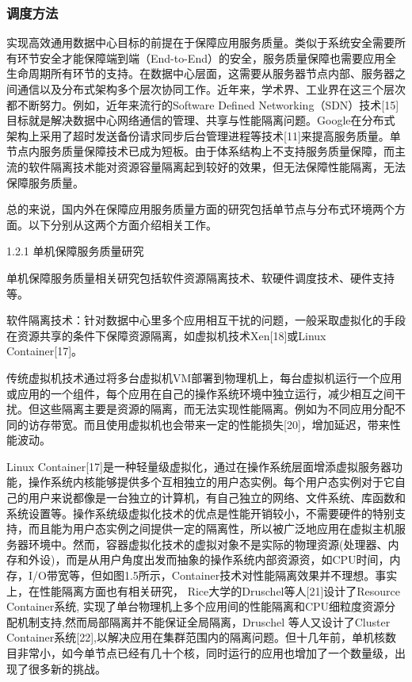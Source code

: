 \subsubsection*{调度方法}
\label{sec:other}

实现高效通用数据中心目标的前提在于保障应用服务质量。类似于系统安全需要所有环节安全才能保障端到端（End-to-End）的安全，服务质量保障也需要应用全生命周期所有环节的支持。在数据中心层面，这需要从服务器节点内部、服务器之间通信以及分布式架构多个层次协同工作。近年来，学术界、工业界在这三个层次都不断努力。例如，近年来流行的Software Defined Networking（SDN）技术[15]目标就是解决数据中心网络通信的管理、共享与性能隔离问题。Google在分布式架构上采用了超时发送备份请求同步后台管理进程等技术[11]来提高服务质量。单节点内服务质量保障技术已成为短板。由于体系结构上不支持服务质量保障，而主流的软件隔离技术能对资源容量隔离起到较好的效果，但无法保障性能隔离，无法保障服务质量。

总的来说，国内外在保障应用服务质量方面的研究包括单节点与分布式环境两个方面。以下分别从这两个方面介绍相关工作。

1.2.1 单机保障服务质量研究

单机保障服务质量相关研究包括软件资源隔离技术、软硬件调度技术、硬件支持等。

软件隔离技术：针对数据中心里多个应用相互干扰的问题，一般采取虚拟化的手段在资源共享的条件下保障资源隔离，如虚拟机技术Xen[18]或Linux Container[17]。

传统虚拟机技术通过将多台虚拟机VM部署到物理机上，每台虚拟机运行一个应用或应用的一个组件，每个应用在自己的操作系统环境中独立运行，减少相互之间干扰。但这些隔离主要是资源的隔离，而无法实现性能隔离。例如为不同应用分配不同的访存带宽。而且使用虚拟机也会带来一定的性能损失[20]，增加延迟，带来性能波动。

Linux Container[17]是一种轻量级虚拟化，通过在操作系统层面增添虚拟服务器功能，操作系统内核能够提供多个互相独立的用户态实例。每个用户态实例对于它自己的用户来说都像是一台独立的计算机，有自己独立的网络、文件系统、库函数和系统设置等。操作系统级虚拟化技术的优点是性能开销较小，不需要硬件的特别支持，而且能为用户态实例之间提供一定的隔离性，所以被广泛地应用在虚拟主机服务器环境中。然而，容器虚拟化技术的虚拟对象不是实际的物理资源(处理器、内存和外设)，而是从用户角度出发而抽象的操作系统内部资源资，如CPU时间，内存，I/O带宽等，但如图1.5所示，Container技术对性能隔离效果并不理想。事实上，在性能隔离方面也有相关研究， Rice大学的Druschel等人[21]设计了Resource Container系统, 实现了单台物理机上多个应用间的性能隔离和CPU细粒度资源分配机制支持,然而局部隔离并不能保证全局隔离，Druschel 等人又设计了Cluster Container系统[22],以解决应用在集群范围内的隔离问题。但十几年前，单机核数目非常小，如今单节点已经有几十个核，同时运行的应用也增加了一个数量级，出现了很多新的挑战。


